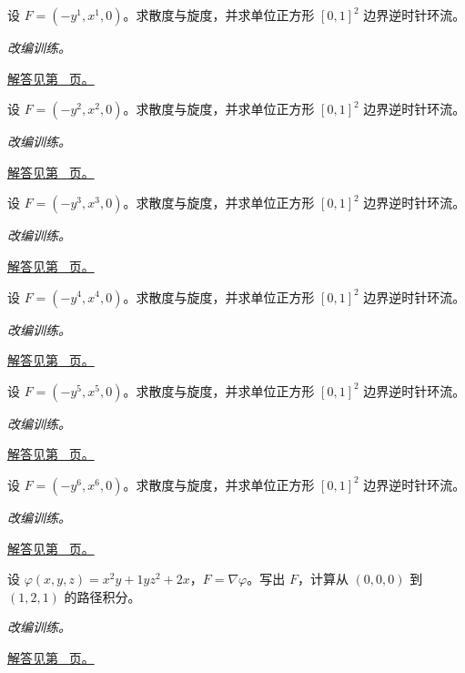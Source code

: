 \documentclass[12pt,fontset=fandol]{ctexart}
\begin{document}
\begin{example}[一个非零旋度的场]\label{ex:c44q7}
设 $F=(-y^{1},x^{1},0)$。求散度与旋度，并求单位正方形 $[0,1]^2$ 边界逆时针环流。
\par\textit{改编训练。}\par\hyperref[ans:c44q7]{解答见第~\pageref{ans:c44q7} 页。}
\end{example}
\begin{example}[一个非零旋度的场]\label{ex:c44q8}
设 $F=(-y^{2},x^{2},0)$。求散度与旋度，并求单位正方形 $[0,1]^2$ 边界逆时针环流。
\par\textit{改编训练。}\par\hyperref[ans:c44q8]{解答见第~\pageref{ans:c44q8} 页。}
\end{example}
\begin{example}[一个非零旋度的场]\label{ex:c44q9}
设 $F=(-y^{3},x^{3},0)$。求散度与旋度，并求单位正方形 $[0,1]^2$ 边界逆时针环流。
\par\textit{改编训练。}\par\hyperref[ans:c44q9]{解答见第~\pageref{ans:c44q9} 页。}
\end{example}
\begin{example}[一个非零旋度的场]\label{ex:c44q10}
设 $F=(-y^{4},x^{4},0)$。求散度与旋度，并求单位正方形 $[0,1]^2$ 边界逆时针环流。
\par\textit{改编训练。}\par\hyperref[ans:c44q10]{解答见第~\pageref{ans:c44q10} 页。}
\end{example}
\begin{example}[一个非零旋度的场]\label{ex:c44q11}
设 $F=(-y^{5},x^{5},0)$。求散度与旋度，并求单位正方形 $[0,1]^2$ 边界逆时针环流。
\par\textit{改编训练。}\par\hyperref[ans:c44q11]{解答见第~\pageref{ans:c44q11} 页。}
\end{example}
\begin{example}[一个非零旋度的场]\label{ex:c44q12}
设 $F=(-y^{6},x^{6},0)$。求散度与旋度，并求单位正方形 $[0,1]^2$ 边界逆时针环流。
\par\textit{改编训练。}\par\hyperref[ans:c44q12]{解答见第~\pageref{ans:c44q12} 页。}
\end{example}
\begin{example}[势函数给出的空间路径积分]\label{ex:c44q13}
设 $\varphi(x,y,z)=x^2y+1yz^2+2x$，$F=\nabla\varphi$。写出 $F$，计算从 $(0,0,0)$ 到 $(1,2,1)$ 的路径积分。
\par\textit{改编训练。}\par\hyperref[ans:c44q13]{解答见第~\pageref{ans:c44q13} 页。}
\end{example}
\end{document}
